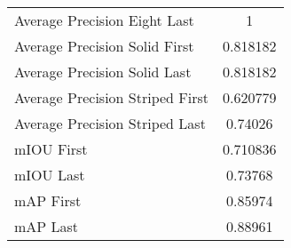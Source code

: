 \begin{figure}
\begin{subfigure}[b]{0.49\textwidth}
\begin{tabular}{|l|c|}
    Average Precision Eight Last & 1 \\
    Average Precision Solid First & 0.818182 \\
    Average Precision Solid Last & 0.818182 \\
    Average Precision Striped First & 0.620779 \\
    Average Precision Striped Last & 0.74026 \\
    \hline
    mIOU First & 0.710836 \\
    mIOU Last & 0.73768 \\
    mAP First & 0.85974 \\
    mAP Last & 0.88961 \\
    \hline
\end{tabular}
\end{subfigure}
\end{figure}

